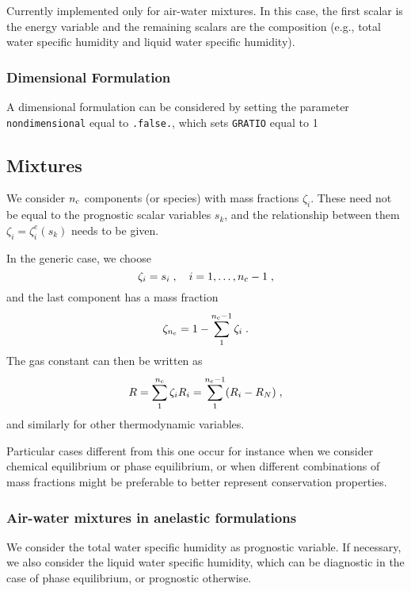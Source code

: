 Currently implemented only for air-water mixtures. In this case, the first scalar is the energy variable and the remaining scalars are the composition (e.g., total water specific humidity and liquid water specific humidity).

\subsubsection{Dimensional Formulation}

A dimensional formulation can be considered by setting the parameter \texttt{nondimensional} equal to \texttt{.false.}, which sets \texttt{GRATIO} equal to 1

\subsection{Mixtures}

We consider $n\sc$ components (or species) with mass fractions $\zeta_i$. These need not be equal to the prognostic scalar variables $s_k$, and the relationship between them $\zeta_i=\zeta_i^e(s_k)$ needs to be given.

In the generic case, we choose
\begin{equation}
    \zeta_i=s_i\;,\quad i=1,\ldots,n\sc-1\;,
\end{equation}
and the last component has a mass fraction
\begin{equation}
    \zeta_{n\sc} = 1-\sum_1^{n\sc-1}\zeta_i \;.
\end{equation} 
The gas constant can then be written as 
\begin{equation}
    R=\sum_1^{n\sc}\zeta_iR_i=\sum_1^{n\sc-1}(R_i-R_N) \;,
\end{equation}
and similarly for other thermodynamic variables.

Particular cases different from this one occur for instance when we consider chemical equilibrium or phase equilibrium, or when different combinations of mass fractions might be preferable to better represent conservation properties.


\subsubsection{Air-water mixtures in anelastic formulations}

We consider the total water specific humidity as prognostic variable. If necessary, we also consider the liquid water specific humidity, which can be diagnostic in the case of phase equilibrium, or prognostic otherwise.



